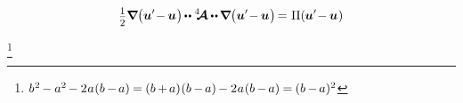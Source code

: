 \begin{equation*}
\smalldisplaystyleonehalf
\boldnabla
\bigl(
\bm{u}' \hspace{-0.4ex} - \hspace{-0.1ex} \bm{u}
\hspace{.1ex} \bigr) \hspace{-0.2ex} \dotdotp \stiffnesstensor \hspace{-0.1ex} \dotdotp \hspace{-0.15ex}
\boldnabla \bigl(
\bm{u}' \hspace{-0.4ex} - \hspace{-0.1ex} \bm{u}
\hspace{.1ex} \bigr) \hspace{-0.25ex}
= \hspace{.1ex}
\potentialenergydensity (\hspace{-0.1ex}\bm{u}' \hspace{-0.4ex} - \hspace{-0.1ex} \bm{u}
\hspace{.1ex} )
\end{equation*}

\noindent
{}
\footnote{%
${b^{\hspace{.1ex}2} \hspace{-0.2ex} - a^2 \hspace{-0.2ex} - 2 \hspace{.1ex} a \hspace{.1ex} (b \hspace{-0.1ex} - \hspace{-0.2ex} a) \hspace{-0.1ex}
=\hspace{-0.1ex}  (b \hspace{-0.1ex} + \hspace{-0.2ex} a) \hspace{.1ex} (b \hspace{-0.1ex} - \hspace{-0.2ex} a) \hspace{-0.15ex} - 2 \hspace{.1ex} a \hspace{.1ex} (b \hspace{-0.1ex} - \hspace{-0.2ex} a) \hspace{-0.1ex}
= \hspace{-0.1ex} (b \hspace{-0.1ex} - \hspace{-0.2ex} a)^2}$}

